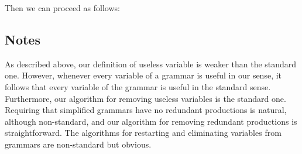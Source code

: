 Then we can proceed as follows:


\subsection{Notes}

As described above, our definition of useless variable is weaker than
the standard one.  However, whenever every variable of a grammar is
useful in our sense, it follows that every variable of the grammar is
useful in the standard sense.  Furthermore, our algorithm for removing
useless variables is the standard one.  Requiring that simplified
grammars have no redundant productions is natural, although
non-standard, and our algorithm for removing redundant productions is
straightforward. The algorithms for restarting and eliminating
variables from grammars are non-standard but obvious.

%
%

